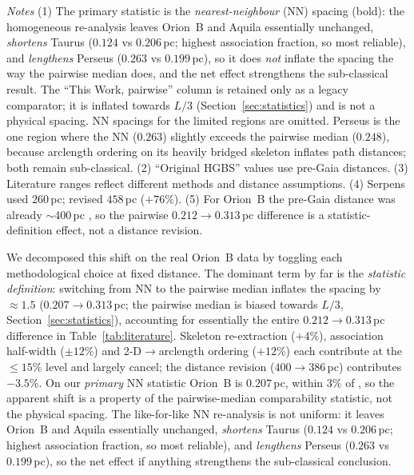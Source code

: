 \documentclass[usenatbib,twoside,twocolumn]{mnras}
\begin{document}
\begin{table}
\vspace{0.1in}
\footnotesize
\emph{Notes} (1) The primary statistic is the \emph{nearest-neighbour} (NN) spacing (bold): the homogeneous re-analysis leaves Orion~B and Aquila essentially unchanged, \emph{shortens} Taurus ($0.124$ vs $0.206$\,pc; highest association fraction, so most reliable), and \emph{lengthens} Perseus ($0.263$ vs $0.199$\,pc), so it does \emph{not} inflate the spacing the way the pairwise median does, and the net effect strengthens the sub-classical result. The ``This Work, pairwise'' column is retained only as a legacy comparator; it is inflated towards $L/3$ (Section~\ref{sec:statistics}) and is not a physical spacing. NN spacings for the limited regions are omitted. Perseus is the one region where the NN ($0.263$) slightly exceeds the pairwise median ($0.248$), because arclength ordering on its heavily bridged skeleton inflates path distances; both remain sub-classical. (2) ``Original HGBS'' values use pre-Gaia distances. (3) Literature ranges reflect different methods and distance assumptions. (4) Serpens used $260$\,pc; revised $458$\,pc ($+76\%$). (5) For Orion~B the pre-Gaia distance was already $\sim$400\,pc \citep{Konyves2020}, so the pairwise $0.212\to0.313$\,pc difference is a statistic-definition effect, not a distance revision.
\end{table}

We decomposed this shift on the real Orion~B data by toggling each methodological choice at fixed distance. The dominant term by far is the \emph{statistic definition}: switching from NN to the pairwise median inflates the spacing by $\approx1.5$ ($0.207\to0.313$\,pc; the pairwise median is biased towards $L/3$, Section~\ref{sec:statistics}), accounting for essentially the entire $0.212\to0.313$\,pc difference in Table~\ref{tab:literature}. Skeleton re-extraction ($+4\%$), association half-width ($\pm12\%$) and 2-D$\to$arclength ordering ($+12\%$) each contribute at the $\le15\%$ level and largely cancel; the distance revision ($400\to386$\,pc) contributes $-3.5\%$. On our \emph{primary} NN statistic Orion~B is $0.207$\,pc, within $3\%$ of \citet{Konyves2020}, so the apparent shift is a property of the pairwise-median comparability statistic, not the physical spacing. The like-for-like NN re-analysis is not uniform: it leaves Orion~B and Aquila essentially unchanged, \emph{shortens} Taurus ($0.124$ vs $0.206$\,pc; highest association fraction, so most reliable), and \emph{lengthens} Perseus ($0.263$ vs $0.199$\,pc), so the net effect if anything strengthens the sub-classical conclusion.
\end{document}
